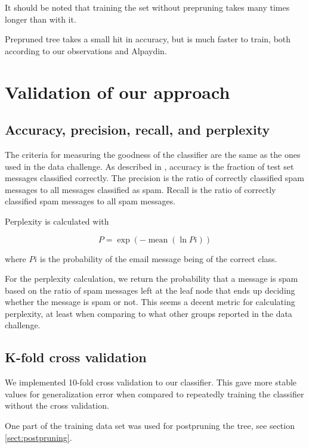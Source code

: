 \documentclass[a4paper,10pt]{article}
\begin{document}
It should be noted that training the set without prepruning takes many
times longer than with it.

Prepruned tree takes a small hit in accuracy, but is much faster to
train, both according to our observations and 
Alpaydin\cite[p. 195 mun kirjassa]{alpaydin2004}.

\section{Validation of our approach}

\subsection{Accuracy, precision, recall, and perplexity}

The criteria for measuring the goodness of the classifier are the same
as the ones used in the data challenge.  As described in
\cite{termproject}, accuracy is the fraction of test set messages
classified correctly.  The precision is the ratio of correctly
classified spam messages to all messages classified as spam.  Recall is
the ratio of correctly classified spam messages to all spam messages.

Perplexity is calculated with

\begin{equation}
P = \exp(-\operatorname{mean}(\ln{Pi}))
\end{equation}

where $Pi$ is the probability of the email message being of the correct
class.

For the perplexity calculation, we return the probability that a message
is spam based on the ratio of spam messages left at the leaf node that
ends up deciding whether the message is spam or not.  This seems a
decent metric for calculating perplexity, at least when comparing to
what other groups reported in the data challenge.

\subsection{K-fold cross validation}

We implemented 10-fold cross validation to our classifier.  This
gave more stable values for generalization error when compared to
repeatedly training the classifier without the cross validation.

One part of the training data set was used for postpruning the tree, see
section \ref{sect:postpruning}.
\end{document}
